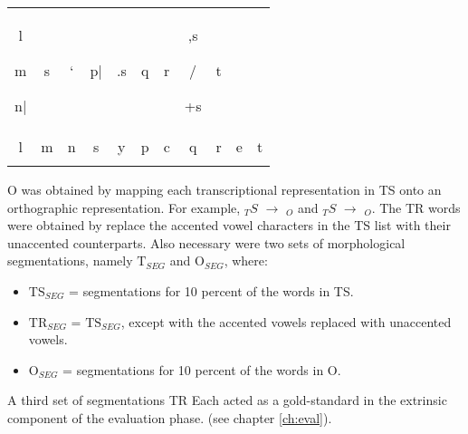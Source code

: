 \begin{table}[ht]
\begin{tabular}{c c c c c c c c c c c}
 \begin{cjhebrew}l\end{cjhebrew} \begin{cjhebrew}m\end{cjhebrew}
           \begin{cjhebrew}n|\end{cjhebrew} & \begin{cjhebrew}s\end{cjhebrew} & \begin{cjhebrew}`\end{cjhebrew} 
           & \begin{cjhebrew}p|\end{cjhebrew} & \begin{cjhebrew}.s\end{cjhebrew} & \begin{cjhebrew}q\end{cjhebrew} & \begin{cjhebrew}r\end{cjhebrew} & \begin{cjhebrew},s\end{cjhebrew}/\begin{cjhebrew}+s\end{cjhebrew} & \begin{cjhebrew}t\end{cjhebrew} \\
	  l & m & n & s & y & p & c & q & r & e & t \\
\hline
\setlength{\extrarowheight}{8pt}
\end{tabular}
\end{table}
O was obtained by mapping each transcriptional representation 
in TS onto an orthographic representation. For example, $_TS$ $\to$
$_O$ and $_TS$ $\to$ $_O$. The TR words were obtained by replace the accented vowel characters in the TS list with their unaccented counterparts.
Also necessary were two sets of morphological segmentations, namely $\text{T}_{SEG}$ and $\text{O}_{SEG}$, where:
\begin{itemize}
\item $\text{TS}_{SEG}$ = segmentations for 10 percent of the words in TS.
\item $\text{TR}_{SEG}$ = $\text{TS}_{SEG}$, except with the accented vowels replaced
with unaccented vowels.
\item  $\text{O}_{SEG}$ = segmentations for 10 percent of the words in O.
\end{itemize} 
A third set of segmentations TR
Each acted as a gold-standard in the extrinsic 
component of the evaluation phase. (see chapter \ref{ch:eval}).  

